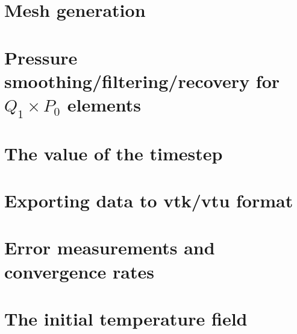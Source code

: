 \section{Mesh generation} \label{sec:meshes}  %
\newpage %
\section{Pressure smoothing/filtering/recovery for $Q_1\times P_0$ elements \label{psmoothing}} 
\newpage %
\newpage %
\section{The value of the timestep}\label{ss:cfl}  %
\newpage %
\section{Exporting data to vtk/vtu format}  %
\newpage %
\section{Error measurements and convergence rates}  %
\newpage %
\section{The initial temperature field}  %
\newpage %
